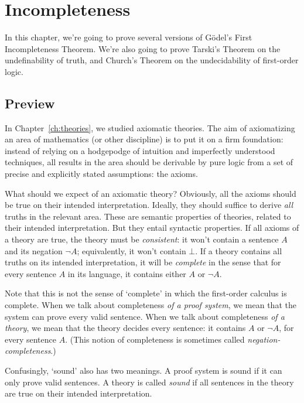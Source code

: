 \setcounter{chapter}{8}
\chapter{Incompleteness}\label{ch:incompleteness}

In this chapter,
we're going to prove several versions of Gödel's First Incompleteness Theorem.
We're also going to prove Tarski's Theorem on the undefinability of truth,
and Church's Theorem on the undecidability of first-order logic.

\section{Preview}\label{sec:incompleteness-preview}

In Chapter~\ref{ch:theories},
we studied axiomatic theories.
The aim of axiomatizing an area of mathematics (or other discipline)
is to put it on a firm foundation:
instead of relying on a hodgepodge of intuition and imperfectly understood techniques,
all results in the area should be derivable by pure logic
from a set of precise and explicitly stated assumptions: the axioms.

What should we expect of an axiomatic theory?
Obviously,
all the axioms should be true
on their intended interpretation.
Ideally,
they should suffice to derive \emph{all} truths in the relevant area.
These are semantic properties of theories,
related to their intended interpretation.
But they entail syntactic properties.
If all axioms of a theory are true,
the theory must be \emph{consistent}:
it won't contain a sentence $A$ and its negation $\neg A$;
equivalently,
it won't contain $\bot$.
If a theory contains all truths on its intended interpretation,
it will be \emph{complete} in the sense that
for every sentence $A$ in its language,
it contains either $A$ or $\neg A$.

Note that this is not the sense of `complete' in which
the first-order calculus is complete.
When we talk about completeness \emph{of a proof system},
we mean that the system can prove every valid sentence.
When we talk about completeness \emph{of a theory},
we mean that the theory decides every sentence:
it contains $A$ or $\neg A$,
for every sentence $A$.
(This notion of completeness is sometimes called \emph{negation-completeness}.)

Confusingly,
`sound' also has two meanings.
A proof system is sound if it can only prove valid sentences.
A theory is called \emph{sound} if
all sentences in the theory are true
on their intended interpretation.

